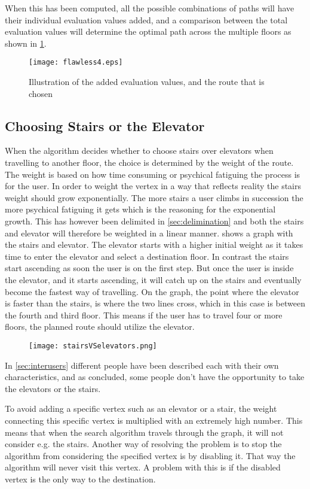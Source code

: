 When this has been computed, all the possible combinations of paths will have their individual evaluation values added, and a comparison between the total evaluation values will determine the optimal path across the multiple floors as shown in \cref{fig:flawless3}.

\begin{figure}[ht!]
    \centering
    \texttt{[image: flawless4.eps]}
    \caption{Illustration of the added evaluation values, and the route that is chosen}
    \label{fig:flawless3}
  \end{figure}


\subsection{Choosing Stairs or the Elevator}

When the algorithm decides whether to choose stairs over elevators when travelling to another floor, the choice is determined by the weight of the route. The weight is based on how time consuming or psychical fatiguing the process is for the user. In order to weight the vertex in a way that reflects reality the stairs weight should grow exponentially. The more stairs a user climbs in succession the more psychical fatiguing it gets which is the reasoning for the exponential growth. This has however been delimited in \cref{sec:delimination} and both the stairs and elevator will therefore be weighted in a linear manner.  shows a graph with the stairs and elevator. The elevator starts with a higher initial weight as it takes time to enter the elevator and select a destination floor. In contrast the stairs start ascending as soon the user is on the first step. But once the user is inside the elevator, and it starts ascending, it will catch up on the stairs and eventually become the fastest way of travelling. On the graph, the point where the elevator is faster than the stairs, is where the two lines cross, which in this case is between the fourth and third floor. This means if the user has to travel four or more floors, the planned route should utilize the elevator.

\begin{figure}[ht!]
    \centering
    \texttt{[image: stairsVSelevators.png]}
    \caption{}\label{fig:labeled_stairsVSelevators}
  \end{figure}


In \cref{sec:interusers} different people have been described each with their own characteristics, and as concluded, some people don't have the opportunity to take the elevators or the stairs. 

To avoid adding a specific vertex such as an elevator or a stair, the weight connecting this specific vertex is multiplied with an extremely high number. This means that when the search algorithm travels through the graph, it will not consider e.g. the stairs.
Another way of resolving the problem is to stop the algorithm from considering the specified vertex is by disabling it. That way the algorithm will never visit this vertex. A problem with this is if the disabled vertex is the only way to the destination.



